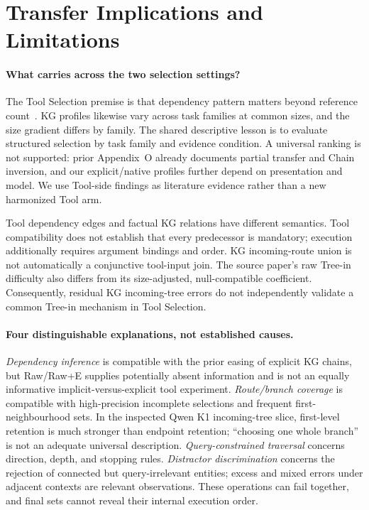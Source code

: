 \section{Transfer Implications and Limitations}
\label{sec:discussion}
\paragraph{What carries across the two selection settings?}
The Tool Selection premise is that dependency pattern matters beyond reference count~\cite{anonymousToolGraph}. KG profiles likewise vary across task families at common sizes, and the size gradient differs by family. The shared descriptive lesson is to evaluate structured selection by task family and evidence condition. A universal ranking is not supported: prior Appendix~O already documents partial transfer and Chain inversion, and our explicit/native profiles further depend on presentation and model. We use Tool-side findings as literature evidence rather than a new harmonized Tool arm.

Tool dependency edges and factual KG relations have different semantics. Tool compatibility does not establish that every predecessor is mandatory; execution additionally requires argument bindings and order. KG incoming-route union is not automatically a conjunctive tool-input join. The source paper's raw Tree-in difficulty also differs from its size-adjusted, null-compatible coefficient. Consequently, residual KG incoming-tree errors do not independently validate a common Tree-in mechanism in Tool Selection.

\paragraph{Four distinguishable explanations, not established causes.}
\emph{Dependency inference} is compatible with the prior easing of explicit KG chains, but Raw/Raw+E supplies potentially absent information and is not an equally informative implicit-versus-explicit tool experiment. \emph{Route/branch coverage} is compatible with high-precision incomplete selections and frequent first-neighbourhood sets. In the inspected Qwen K1 incoming-tree slice, first-level retention is much stronger than endpoint retention; ``choosing one whole branch'' is not an adequate universal description. \emph{Query-constrained traversal} concerns direction, depth, and stopping rules. \emph{Distractor discrimination} concerns the rejection of connected but query-irrelevant entities; excess and mixed errors under adjacent contexts are relevant observations. These operations can fail together, and final sets cannot reveal their internal execution order.

